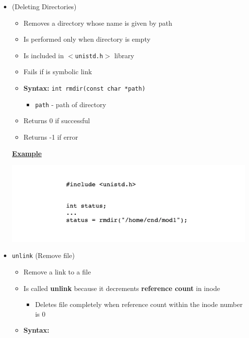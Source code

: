 \documentclass[12pt]{article}
\begin{document}
\begin{itemize}
\begin{itemize}
        \item {} (Deleting Directories)

        \begin{itemize}
            \item Removes a directory whose name is given by path
            \item Is performed only when directory is empty
            \item Is included in \texttt{$<$unistd.h$>$} library
            \item Fails if is symbolic link
            \item \textbf{Syntax:} \texttt{int rmdir(const char *path)}

            \begin{itemize}
                \item \texttt{path} - path of directory
            \end{itemize}
            \item Returns 0 if successful
            \item Returns -1 if error
        \end{itemize}

        \bigskip

        \underline{\textbf{Example}}

        \begin{center}
        \includegraphics[width=\linewidth]{../images/midterm_4_solution_16.png}
        \end{center}

        \item \texttt{unlink} (Remove file)

        \begin{itemize}
            \item Remove a link to a file
            \item Is called \textbf{unlink} because it decrements \textbf{reference count} in inode
            \begin{itemize}
                \item Deletes file completely when reference count within the inode number is 0
            \end{itemize}
            \item \textbf{Syntax:}


\end{itemize}
\end{itemize}
\end{itemize}
\end{document}
